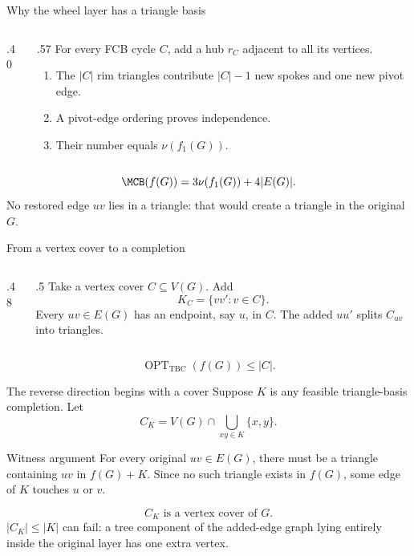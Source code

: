 \begin{frame}{Why the wheel layer has a triangle basis}
 \begin{columns}[c,onlytextwidth]
  \begin{column}{.40\textwidth}
   \begin{center}\resizebox{.84\linewidth}{!}{\WheelFig}\end{center}
  \end{column}
  \begin{column}{.57\textwidth}
   For every FCB cycle \(C\), add a hub \(r_C\) adjacent to all its vertices.
   \begin{enumerate}
    \item The \(|C|\) rim triangles contribute \(|C|-1\) new spokes and one new pivot edge.
    \item A pivot-edge ordering proves independence.
    \item Their number equals \(\nu(f_1(G))\).
   \end{enumerate}
  \end{column}
 \end{columns}
 \vspace{.15cm}
 \[\MCB(f(G))=3\nu(f_1(G))+4|E(G)|.\]
 \small No restored edge \(uv\) lies in a triangle: that would create a triangle in the original \(G\).
\end{frame}


\begin{frame}{From a vertex cover to a completion}
 \begin{columns}[c,onlytextwidth]
  \begin{column}{.48\textwidth}
   \begin{center}\resizebox{.88\linewidth}{!}{\FourCycleGadget}\end{center}
  \end{column}
  \begin{column}{.5\textwidth}
   Take a vertex cover \(C\subseteq V(G)\). Add
   \[ K_C=\{vv':v\in C\}.\]
   Every \(uv\in E(G)\) has an endpoint, say \(u\), in \(C\). The added \(uu'\) splits \(C_{uv}\) into triangles.
  \end{column}
 \end{columns}
 \vspace{.06cm}
 \[\operatorname{OPT}_{\mathrm{TBC}}(f(G))\le |C|.\]
\end{frame}


\begin{frame}{The reverse direction begins with a cover}
 Suppose $K$ is any feasible triangle-basis completion. Let
 \[ C_K=V(G)\cap\bigcup_{xy\in K}\{x,y\}. \]
 \begin{block}{Witness argument}
 For every original $uv\in E(G)$, there must be a triangle containing $uv$ in $f(G)+K$. Since no such triangle exists in $f(G)$, some edge of $K$ touches $u$ or $v$.
 \end{block}
 \[\boxed{C_K\text{ is a vertex cover of }G}.\]
  $|C_K|\le|K|$ can fail: a tree component of the added-edge graph lying entirely inside the original layer has one extra vertex.
\end{frame}


